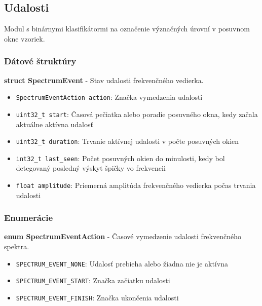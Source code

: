 \subsection{Udalosti} \label{modules:events}
Modul s binárnymi klasifikátormi na označenie význačných úrovní v posuvnom okne vzoriek.

\subsubsection*{Dátové štruktúry}
\textbf{struct SpectrumEvent} - Stav udalosti frekvenčného vedierka.
\begin{itemize}[noitemsep, topsep=0pt]
	\item \verb|SpectrumEventAction action|: Značka vymedzenia udalosti
	\item \verb|uint32_t start|: Časová pečiatka alebo poradie posuvného okna, kedy začala aktuálne aktívna udalosť
	\item \verb|uint32_t duration|: Trvanie aktívnej udalosti v počte posuvných okien
	\item \verb|int32_t last_seen|: Počet posuvných okien do minulosti, kedy bol detegovaný posledný výskyt špičky vo frekvencii
	\item \verb|float amplitude|: Priemerná amplitúda frekvenčného vedierka počas trvania udalosti
\end{itemize}

\subsubsection*{Enumerácie}
\textbf{enum SpectrumEventAction} - Časové vymedzenie udalosti frekvenčného spektra.
	\begin{itemize}[noitemsep, topsep=0pt]
		\item \verb|SPECTRUM_EVENT_NONE|: Udalosť prebieha alebo žiadna nie je aktívna
		\item \verb|SPECTRUM_EVENT_START|: Značka začiatku udalosti
		\item \verb|SPECTRUM_EVENT_FINISH|: Značka ukončenia udalosti
	\end{itemize}

